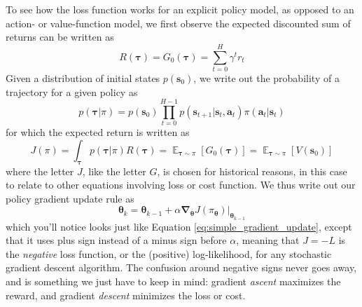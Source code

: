 \documentclass{article}
\begin{document}
To see how the loss function works for an explicit policy model, as opposed to an action- or value-function model, we first observe the expected discounted sum of returns can be written as \begin{equation}R(\boldsymbol{\tau})=G_0(\boldsymbol{\tau})=\sum_{t=0}^H\gamma^t r_t\end{equation} Given a distribution of initial states $p(\mathbf{s}_0)$, we write out the probability of a trajectory for a given policy as  \begin{equation}p(\boldsymbol{\tau}|\pi)=p(\mathbf{s}_0)\prod_{t=0}^{H-1}p(\mathbf{s}_{t+1}|\mathbf{s}_t,\mathbf{a}_t)\pi(\mathbf{a}_t|\mathbf{s}_t)\end{equation}for which the expected return is written as  \begin{equation}\label{eq:J}J(\pi)=\int_{\boldsymbol{\tau}}p(\boldsymbol{\tau}|\pi)R(\boldsymbol{\tau})=\mathop{\mathbb{E}}_{\boldsymbol{\tau}\sim\pi}[G_0(\boldsymbol{\tau})]=\mathop{\mathbb{E}}_{\boldsymbol{\tau}\sim\pi}[V(\mathbf{s}_0)]\end{equation}where the letter $J$, like the letter $G$, is chosen for historical reasons, in this case to relate to other equations involving loss or cost function. We thus write out our policy gradient update rule as \begin{equation}\label{eq:gradient_update}
\boldsymbol{\theta}_{k}=\boldsymbol{\theta}_{k-1}+\alpha \boldsymbol{\nabla}_{\boldsymbol{\theta}}J(\pi_{\boldsymbol{\theta}})|_{\boldsymbol{\theta}_{k-1}}
\end{equation} which you'll notice looks just like Equation \ref{eq:simple_gradient_update}, except that it uses plus sign instead of a minus sign before $\alpha$, meaning that $J=-L$ is the \textit{negative} loss function, or the (positive) log-likelihood, for any stochastic gradient descent algorithm. The confusion around negative signs never goes away, and is something we just have to keep in mind: gradient \textit{ascent} maximizes the reward, and gradient \textit{descent} minimizes the loss or cost.
\end{document}
